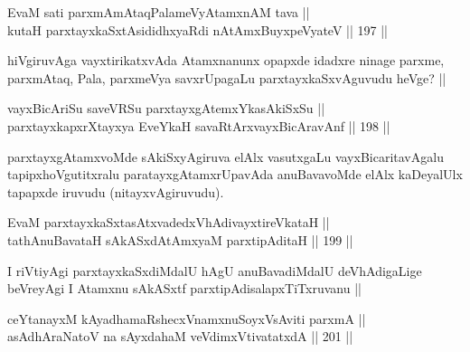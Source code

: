 \begin{shl}
EvaM sati parxmAmAtaqPalameVyAtamxnAM tava || \\
kutaH parxtayxkaSxtAsididhxyaRdi nA\s \s tAmx\s BuyxpeVyateV ||  197 ||  
\end{shl}

\begin{artha}
hiVgiruvAga vayxtirikatxvAda Atamxnanunx opapxde idadxre ninage parxme, parxmAtaq, Pala, parxmeVya savxrUpagaLu parxtayxkaSxvAguvudu heVge? ||
\end{artha}

\begin{shl}
vayxBicAriSu saveVRSu parxtayxgAtemxYkasAkiSxSu || \\
parxtayxkapxrXtayxya EveYkaH savaRtArxvayxBicAravAnf ||  198 ||  
\end{shl}

\begin{artha}
parxtayxgAtamxvoMde sAkiSxyAgiruva elAlx vasutxgaLu vayxBicaritavAgalu tapipxhoVgutitxralu paratayxgAtamxrUpavAda anuBavavoMde elAlx kaDeyalUlx tapapxde iruvudu (nitayxvAgiruvudu).
\end{artha}

\begin{shl}
EvaM parxtayxkaSxtasAtxvadedxVhAdivayxtireVkataH || \\
tathA\s nuBavataH sAkASxdAtAmx\s yaM parxtipAditaH ||  199 ||  
\end{shl}

\begin{artha}
I riVtiyAgi parxtayxkaSxdiMdalU hAgU anuBavadiMdalU deVhAdigaLige beVreyAgi I Atamxnu sAkASxtf parxtipAdisalapxTiTxruvanu ||
\end{artha}


\begin{shl}
ceYtanayxM kAyadhamaRshecxVnamxnuSoyxV\s sAviti parxmA || \\
asAdhAraNatoV na sAyxdahaM veVdimxVtivatatxdA ||  201 ||  
\end{shl}

